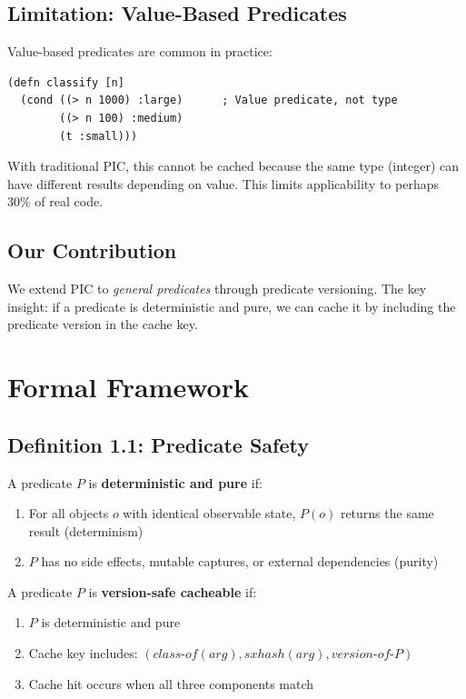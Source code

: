 \documentclass[sigplan,review,anonymous]{acmart}
\begin{document}
\subsection{Limitation: Value-Based Predicates}

Value-based predicates are common in practice:

\begin{lstlisting}
(defn classify [n]
  (cond ((> n 1000) :large)      ; Value predicate, not type
        ((> n 100) :medium)
        (t :small)))
\end{lstlisting}

With traditional PIC, this cannot be cached because the same type (integer) can have different results depending on value. This limits applicability to perhaps 30\% of real code.

\subsection{Our Contribution}

We extend PIC to \emph{general predicates} through predicate versioning. The key insight: if a predicate is deterministic and pure, we can cache it by including the predicate version in the cache key.

\section{Formal Framework}

\subsection{Definition 1.1: Predicate Safety}

\begin{definition}
A predicate $P$ is \textbf{deterministic and pure} if:
\begin{enumerate}
\item For all objects $o$ with identical observable state, $P(o)$ returns the same result (determinism)
\item $P$ has no side effects, mutable captures, or external dependencies (purity)
\end{enumerate}
\end{definition}

\begin{definition}
A predicate $P$ is \textbf{version-safe cacheable} if:
\begin{enumerate}
\item $P$ is deterministic and pure
\item Cache key includes: $(class\text{-}of(arg), sxhash(arg), version\text{-}of\text{-}P)$
\item Cache hit occurs when all three components match
\end{enumerate}
\end{definition}
\end{document}
